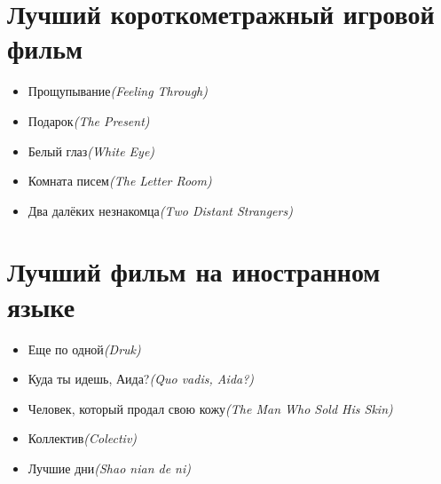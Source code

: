 \documentclass[a4paper,10pt]{article}
\begin{document}
\begin{multicols}{2}
\section{Лучший короткометражный игровой фильм}

\begin{itemize}
	\item Прощупывание\newline\textit{(Feeling Through)}
	\item Подарок\newline\textit{(The Present)}
	\item Белый глаз\newline\textit{(White Eye)}
	\item Комната писем\newline\textit{(The Letter Room)}
	\item Два далёких незнакомца\newline\textit{(Two Distant Strangers)}
\end{itemize}

\section{Лучший фильм на иностранном языке}

\begin{itemize}
	\item Еще по одной\newline\textit{(Druk)}
	\item Куда ты идешь, Аида?\newline\textit{(Quo vadis, Aida?)}
	\item Человек, который продал свою кожу\newline\textit{(The Man Who Sold His Skin)}
	\item Коллектив\newline\textit{(Colectiv)}
	\item Лучшие дни\newline\textit{(Shao nian de ni)}
\end{itemize}

\end{multicols}
\end{document}
